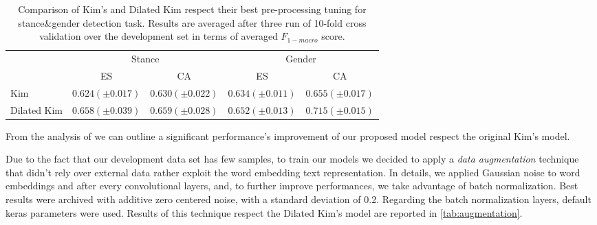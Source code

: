 \begin{table}[h]
	\centering
	\caption{Comparison of Kim's and Dilated Kim respect their best pre-processing tuning for stance\&gender detection task. Results are averaged after three run of 10-fold cross validation over the development set in terms of averaged $F_{1-macro}$ score.}
	\label{tab:dilation}
	\begin{tabular}{l|cc|cc}
		\hline\noalign{\smallskip}
		\multirow{2}{*}{Models}		& \multicolumn{2}{c|}{Stance}	& \multicolumn{2}{c}{Gender}\\
		\cline{2-5}
		& ES		& CA		& ES		& CA		\\
		\noalign{\smallskip}
		\hline
		\noalign{\smallskip}
		Kim							& $0.624 (\pm0.017)$ & $0.630 (\pm0.022)$ & $0.634 (\pm0.011)$ & $0.655 (\pm0.017)$	\\
		Dilated Kim					& $0.658 (\pm0.039)$ & $0.659 (\pm0.028)$ & $0.652 (\pm0.013)$ & $0.715 (\pm0.015)$	\\
		\hline
	\end{tabular}
\end{table}


From the analysis of  we can outline a significant performance's improvement of our proposed model respect the original Kim's model.


Due to the fact that our development data set has few samples, to train our models we decided to apply a \emph{data augmentation} technique that didn't rely over external data rather exploit the word embedding text representation. In details, we applied Gaussian noise  to word embeddings and after every convolutional layers, and, to further improve performances, we take advantage of batch normalization.
Best results were archived with additive zero centered noise, with a standard deviation of 0.2. Regarding the batch normalization layers, default keras parameters were used.
Results of this technique respect the Dilated Kim's model are reported in \cref{tab:augmentation}.

\begin{comment}
\begin{table}[h]
\footnotesize
\caption{Data augmentation study for Dilated Kim's model over the Spanish stance detection development dataset. Results are averaged after three run of 10-fold cross validation over the development set in terms of averaged $F_{1-macro}$ score. }
\label{tab:augmentationOLD}
\centering
\begin{tabular}{c|ccc}
\toprule
\hline
System		& Nothing	& Gaussian noise	& Batch normalization	\\
\hline
Dilated Kim	& 0.658 ($\pm$ 0.039) & 0.664 ($\pm$ 0.043)	& 0.675 ($\pm$ 0.049)	\\
\hline
\bottomrule
\end{tabular}
\end{table}
\end{comment}

